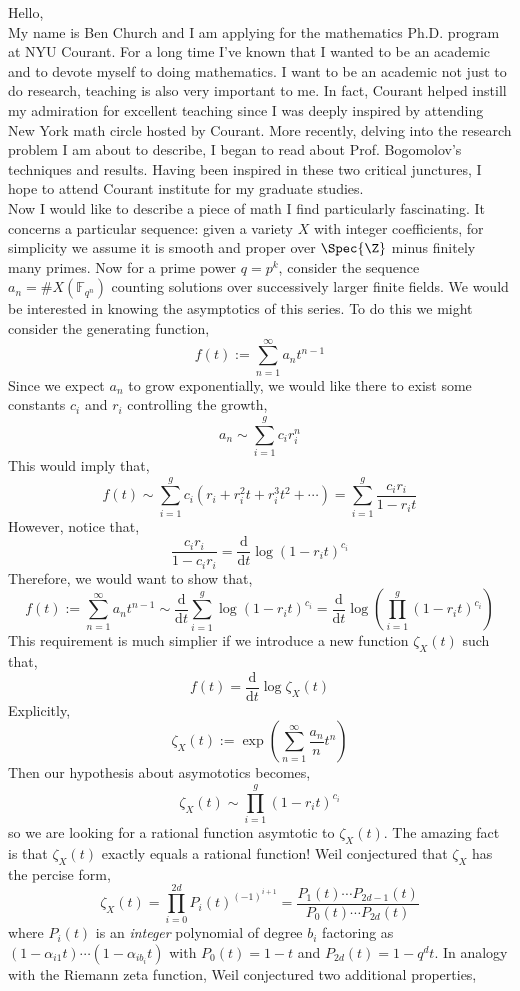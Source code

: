 \documentclass[11pt]{article}
\newcommand{\dt}{\frac{\mathrm{d}}{\mathrm{d} t}}
\begin{document}
Hello,
\bigskip\\
My name is Ben Church and I am applying for the mathematics Ph.D. program at NYU Courant. For a long time I’ve known that I wanted to be an academic and to devote myself to doing mathematics. I want to be an academic not just to do research, teaching is also very important to me. In fact, Courant helped instill my admiration for excellent teaching since I was deeply inspired by attending New York math circle hosted by Courant. More recently, delving into the research problem I am about to describe, I began to read about Prof. Bogomolov's techniques and results. Having been inspired in these two critical junctures, I hope to attend Courant institute for my graduate studies.
\bigskip\\
Now I would like to describe a piece of math I find particularly fascinating. It concerns a particular sequence: given a variety $X$ with integer coefficients, for simplicity we assume it is smooth and proper  over $\Spec{\Z}$ minus finitely many primes. Now for a prime power $q = p^k$, consider the sequence $a_n = \# X(\mathbb{F}_{q^n})$ counting solutions over successively larger finite fields. We would be interested in knowing the asymptotics of this series. To do this we might consider the generating function,
\[ f(t) := \sum_{n = 1}^\infty a_{n} t^{n-1} \]
Since we expect $a_n$ to grow exponentially, we would like there to exist some constants $c_i$ and $r_i$ controlling the growth, 
\[ a_n \sim \sum_{i = 1}^g c_i r_i^{n} \] 
This would imply that,
\[ f(t) \sim \sum_{i = 1}^g c_i (r_i + r_i^2 t + r_i^3 t^2 + \cdots ) = \sum_{i = 1}^g \frac{c_i r_i}{1 - r_i t}  \]
However, notice that,
\[ \frac{c_i r_i}{1 - c_i r_i} = \dt \log{(1 - r_i t)^{c_i}} \]
Therefore, we would want to show that,
\[ f(t) := \sum_{n = 1}^\infty a_n t^{n-1} \sim \dt \sum_{i = 1}^g \log{(1 - r_i t)^{c_i}} = \dt \log{ \left( \prod_{i = 1}^g  (1 - r_i t)^{c_i} \right)} \]
This requirement is much simplier if we introduce a new function $\zeta_X(t)$ such that,
\[ f(t) = \dt \log{\zeta_X(t)} \]
Explicitly,
\[ \zeta_X(t) := \exp{ \left( \sum_{n = 1}^\infty \frac{a_n}{n} t^n \right) } \]
Then our hypothesis about asymototics becomes,
\[ \zeta_X(t) \sim \prod_{i = 1}^g (1 - r_i  t)^{c_i} \]
so we are looking for a rational function asymtotic to $\zeta_X(t)$. The amazing fact is that $\zeta_X(t)$ exactly equals a rational function! Weil conjectured that $\zeta_X$ has the percise form,
\[ \zeta_X(t) = \prod_{i = 0}^{2 d} P_i(t)^{(-1)^{i+1}} = \frac{P_1(t) \cdots P_{2d - 1}(t)}{P_0(t) \cdots P_{2d}(t)} \]
where $P_i(t)$ is an \textit{integer} polynomial of degree $b_i$ factoring as $(1 - \alpha_{i1} t) \cdots (1 - \alpha_{i b_i} t)$ with $P_0(t) = 1 - t$ and $P_{2d}(t) = 1 - q^d t$. In analogy with the Riemann zeta function, Weil conjectured two additional properties,
\end{document}
